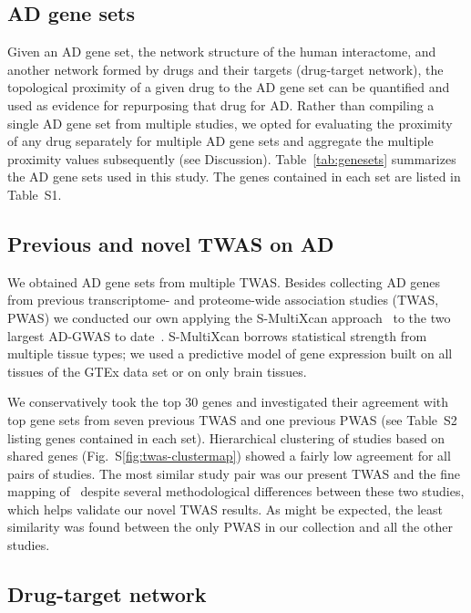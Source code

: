\documentclass[letterpaper]{article}
\begin{document}
\subsection{AD gene sets}

Given an AD gene set, the network structure of the human interactome, and
another network formed by drugs and their targets (drug-target network), the
topological proximity of a given drug to the AD gene set can be
quantified\citep{Guney2016} and used as evidence for repurposing that drug for
AD.  Rather than compiling a single AD gene set from multiple studies, we
opted for evaluating the proximity of any drug separately for multiple AD gene
sets and aggregate the multiple proximity values subsequently (see
Discussion).  Table~\ref{tab:genesets} summarizes the AD gene sets used in
this study.  The genes contained in each set are listed in Table~S1.

\subsection{Previous and novel TWAS on AD}

We obtained AD gene sets from multiple TWAS.  Besides collecting AD genes from
previous transcriptome- and proteome-wide association studies (TWAS, PWAS) we
conducted our own applying the S-MultiXcan approach~\citep{Barbeira2018} to
the two largest AD-GWAS to date~\citep{Schwartzentruber2021,Wightman2021}.
S-MultiXcan borrows statistical strength from multiple tissue types; we used a
predictive model of gene expression built on all tissues of the GTEx data set
or on only brain tissues.

We conservatively took the top 30 genes and investigated their agreement with
top gene sets from seven previous TWAS and one previous PWAS (see Table~S2
listing genes contained in each set).  Hierarchical clustering of studies
based on shared genes (Fig.~S\ref{fig:twas-clustermap}) showed a fairly low
agreement for all pairs of studies.  The most similar study pair was our
present TWAS and the fine mapping of~\cite{Jansen2019} despite several
methodological differences between these two studies, which helps validate our
novel TWAS results.  As might be expected, the least similarity was found
between the only PWAS in our collection and all the other studies.

\subsection{Drug-target network}
\end{document}
